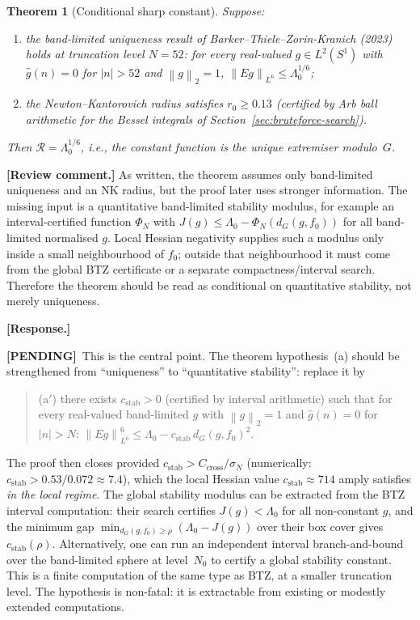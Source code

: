 \documentclass[12pt]{article}
\newtheorem{theorem}{Theorem}[section]
\theoremstyle{definition}
\theoremstyle{remark}
\newcommand{\wh}{\widehat}
\newcommand{\norm}[1]{\left\|#1\right\|}
\newcommand{\review}[1]{\par\smallskip\noindent\textbf{\color{red}[Review comment.]} {\color{red}#1}\par\smallskip}
\newcommand{\response}[1]{\par\noindent\textbf{\color{blue}[Response.]} {\color{blue}#1}\par\smallskip}
\newcommand{\pending}{\textbf{\color{orange}[PENDING]}}
\begin{document}
\begin{theorem}[Conditional sharp constant]
  \label{thm:conditional-sharp}
  Suppose:
  \begin{enumerate}[label=(\alph*),leftmargin=2em]
    \item the band-limited uniqueness result of
      Barker--Thiele--Zorin-Kranich (2023) holds at truncation
      level $N=52$: for every real-valued $g\in L^2(S^1)$ with
      $\wh g(n)=0$ for $|n|>52$ and $\norm{g}_2=1$,
      $\norm{Eg}_{L^6}\leq\Lambda_0^{1/6}$;
    \item the Newton--Kantorovich radius satisfies $r_0\geq 0.13$
      (certified by Arb ball arithmetic for the Bessel integrals
      of Section~\ref{sec:bruteforce-search}).
  \end{enumerate}
  Then $\mathcal R=\Lambda_0^{1/6}$, i.e., the constant function is
  the unique extremiser modulo~$G$.
\end{theorem}

\review{As written, the theorem assumes only band-limited uniqueness and
an NK radius, but the proof later uses stronger information.  The missing
input is a quantitative band-limited stability modulus, for example an
interval-certified function $\Phi_N$ with
$J(g)\leq\Lambda_0-\Phi_N(d_G(g,f_0))$ for all band-limited
normalised $g$.  Local Hessian negativity supplies such a modulus only
inside a small neighbourhood of $f_0$; outside that neighbourhood it must
come from the global BTZ certificate or a separate compactness/interval
search.  Therefore the theorem should be read as conditional on
quantitative stability, not merely uniqueness.}

\response{\pending\ This is the central point.  The theorem
hypothesis~(a) should be strengthened from ``uniqueness'' to
``quantitative stability'': replace it by
\begin{quote}
  (a$'$) there exists $c_{\mathrm{stab}}>0$ (certified by interval
  arithmetic) such that for every real-valued band-limited $g$ with
  $\norm{g}_2=1$ and $\wh g(n)=0$ for $|n|>N$:
  $\norm{Eg}_{L^6}^6\leq\Lambda_0-c_{\mathrm{stab}}\,
  d_G(g,f_0)^2$.
\end{quote}
The proof then closes provided
$c_{\mathrm{stab}}>C_{\mathrm{cross}}/\sigma_N$ (numerically:
$c_{\mathrm{stab}}>0.53/0.072\approx 7.4$), which the local Hessian
value $c_{\mathrm{stab}}\approx 714$ amply satisfies \emph{in the
local regime}.
The global stability modulus can be extracted from the BTZ interval
computation: their search certifies $J(g)<\Lambda_0$ for all
non-constant $g$, and the minimum gap
$\min_{d_G(g,f_0)\geq\rho}(\Lambda_0-J(g))$ over their box cover
gives $c_{\mathrm{stab}}(\rho)$.  Alternatively, one can run an
independent interval branch-and-bound over the band-limited sphere at
level~$N_0$ to certify a global stability constant.  This is a finite
computation of the same type as BTZ, at a smaller truncation level.
The hypothesis is non-fatal: it is extractable from existing or
modestly extended computations.}
\end{document}
